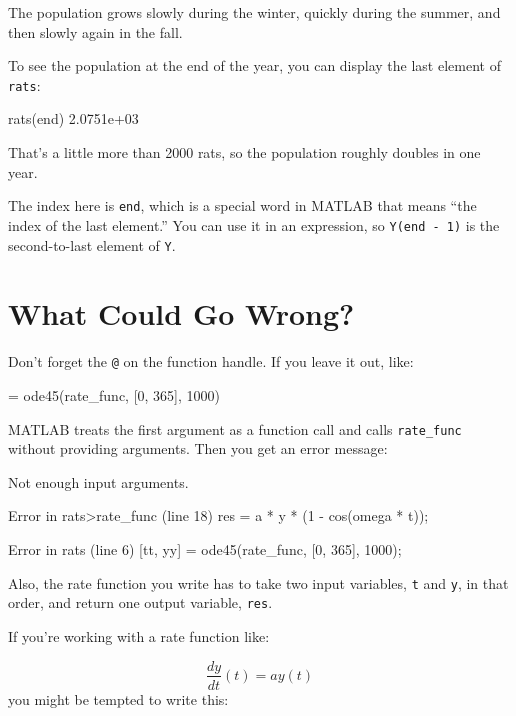 The population grows slowly during the winter, quickly during the summer, and then slowly again in the fall.

To see the population at the end of the year, you can display the last element of \lstinline{rats}:

\begin{code}
rats(end)
2.0751e+03
\end{code}

That's a little more than 2000 rats, so the population roughly doubles in one year.

The index here is \lstinline{end}, which is a special word in MATLAB that means ``the index of the last element.''  You can use it in an expression, so \lstinline{Y(end - 1)} is the second-to-last element of
\lstinline{Y}.



\section{What Could Go Wrong?}

Don't forget the \lstinline{@} on the function handle.
If you leave it out, like:

\begin{code}
[tt, yy] = ode45(rate_func, [0, 365], 1000)
\end{code}
MATLAB treats the first argument as a function
call and calls \lstinline{rate_func} without providing arguments.
Then you get an error message:


\begin{code}
Not enough input arguments.

Error in rats>rate_func (line 18)
    res = a * y * (1 - cos(omega * t));

Error in rats (line 6)
    [tt, yy] = ode45(rate_func, [0, 365], 1000);
\end{code}

Also, the rate function you write has to take two input variables,
\lstinline{t} and \lstinline{y}, in that order, and return one output variable,
\lstinline{res}.


If you're working with a rate function like:

\begin{equation*}
\frac{dy}{dt}(t) = a y(t)
\end{equation*}
you might be tempted to write this:

